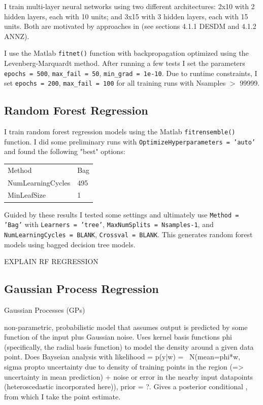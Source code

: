 \documentclass[13pt]{amsart}
\begin{document}
    I train multi-layer neural networks using two different architectures: 2x10 with 2 hidden layers, each with 10 units; and 3x15 with 3 hidden layers, each with 15 units. Both are motivated by approaches in \cite{pzreview} (see sections 4.1.1 DESDM and 4.1.2 ANNZ).

    I use the Matlab \texttt{fitnet()} function with backpropagation optimized using the Levenberg-Marquardt method. After running a few tests I set the parameters \texttt{epochs = 500}, \texttt{max\_fail = 50}, \texttt{min\_grad = 1e-10}. Due to runtime constraints, I set \texttt{epochs = 200}, \texttt{max\_fail = 100} for all training runs with Nsamples $>$ 99999.




  \subsection{Random Forest Regression}

    I train random forest regression models using the Matlab \texttt{fitrensemble()} function. I did some preliminary runs with \texttt{OptimizeHyperparameters = 'auto'} and found the following "best" options:

      \begin{table}[H]
      \begin{tabular}{ll}
        Method            & Bag \\
        NumLearningCycles & 495 \\
        MinLeafSize       & 1
      \end{tabular}
      \end{table}

      Guided by these results I tested some settings and ultimately use \texttt{Method = 'Bag'} with \texttt{Learners = 'tree'}, \texttt{MaxNumSplits = Nsamples-1}, and \texttt{NumLearningCycles = BLANK}, \texttt{Crossval = BLANK}. This generates random forest models using bagged decision tree models.

      EXPLAIN RF REGRESSION




  \subsection{Gaussian Process Regression}

    Gaussian Processes (GPs)

    non-parametric, probabilistic model that assumes output is predicted by some function of the input plus Gaussian noise. Uses kernel basis functions phi (specifically, the radial basis function) to model the density around a given data point. Does Bayseian analysis with likelihood = p(y|w) = ~N(mean=phi*w, sigma propto uncertainty due to density of training points in the region (=> uncertainty in mean prediction) + noise or error in the nearby input datapoints (heteroscedastic incorporated here)), prior = ?. Gives a posterior conditional , from which I take the point estimate.
\end{document}

